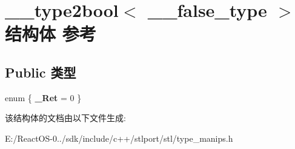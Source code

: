 \hypertarget{struct____type2bool_3_01____false__type_01_4}{}\section{\+\_\+\+\_\+type2bool$<$ \+\_\+\+\_\+false\+\_\+type $>$结构体 参考}
\label{struct____type2bool_3_01____false__type_01_4}
\subsection*{Public 类型}
\begin{DoxyCompactItemize}
\item 
\mbox{\label{struct____type2bool_3_01____false__type_01_4_af8569d5ef6fcb4937616554fb31608ac}} 
enum \{ {\bfseries \+\_\+\+Ret} = 0
 \}
\end{DoxyCompactItemize}


该结构体的文档由以下文件生成\+:\begin{DoxyCompactItemize}
\item 
E\+:/\+React\+O\+S-\/0../sdk/include/c++/stlport/stl/type\+\_\+manips.\+h\end{DoxyCompactItemize}
